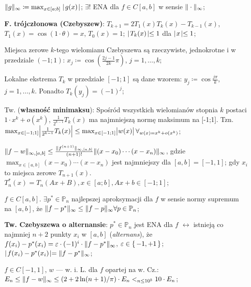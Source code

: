 
\entry
$\|g\|_\infty \coloneqq \max_{x \in [a;b]} \mid\! g(x)\! \mid$;
\entry
$\exists !$
ENA dla
$f\in C[a,b]$
w sensie
$\|\cdot\|_\infty$;


\entry
\textbf{F. trójczłonowa (Czebyszew)}:
$T_{k + 1} = 2T_1(x)T_k(x) - T_{k-1}(x)$,
$T_1(x) = \cos(1 \cdot \theta)=x$,
$T_0(x) = 1$;
\entry
$\mid\! T_k(x)\! \mid \leq 1$
dla
$\mid\! x\! \mid \leq 1$;

\entry
Miejsca zerowe $k$-tego wielomianu Czebyszewa są rzeczywiste, jednokrotne i w przedziale $(-1;1)$:
$x_j \coloneqq \cos(\frac{2j-1}{2k}\pi)$,
$j=1,\ldots,k$;

\entry
Lokalne ekstrema $T_k$ w przedziale $[-1;1]$ są dane wzorem:
$y_j \coloneqq \cos \frac{j\pi}{k}$,
$j=1,\ldots,k$.
Ponadto
$T_k(y_j) = (-1)^j$;

\entry
Tw. (\textbf{własność minimaksu}):
Spośród wszystkich wielomianów stopnia $k$ postaci
$1 \cdot x^k + o(x^k)$,
$\frac{1}{2^{k-1}} T_k(x)$
ma najmniejszą normę maksimum na [-1;1].
Tzn.
$\max_{x \in [-1;1]} \abs{\frac{1}{2^{k-1}} T_k(x)} \leq
\max_{x \in [-1;1]} \abs{w(x)}
\forall_{w(x) = x^k + o(x^k)}$;

\entry
$\|f-w\|_{\infty, [a,b]} \leq
\frac{\|f^{(n+1)}\|_{\infty, [a,b]}}{(n+1)!}
\|(x-x_0) \cdots (x - x_n)\|_\infty$,
gdzie
$\max_{x\in[a,b]} (x-x_0)\cdots(x-x_n)$
jest najmniejszy dla
$[a,b] = [-1,1]$;
gdy $x_i$ to miejsca zerowe $T_{n + 1}(x)$.
\entry
$T^{*}_n(x) = T_n(Ax+B), x \in [a;b], Ax+b \in [-1;1]$;

\entry
$f \in C[a,b]$.
$\exists p^{*} \in \mathbb{P}_n$
najlepszej aproksymacji dla $f$ w sensie normy supremum na $[a,b]$, że
$\|f - p^{*}\|_\infty \leq \|f - p\|_\infty \forall p\in \mathbb{P}_n$;

\entry
\textbf{Tw. Czebyszewa o alternansie}:
$p^{*} \in \mathbb{P}_n$
jest ENA dla $f$
$\leftrightarrow$
istnieją co najmniej $n+2$ punkty $x_i$ w $[a,b]$ (\textit{alternans}), że
$f(x_i) - p^{*}(x_i) = \varepsilon \cdot (-1)^i \cdot \|f - p^{*}\|_\infty$,
$\varepsilon \in \set{-1,+1}$;
$\mid\! f(x_i) - p^{*}(x_i)\! \mid = \|f - p^{*}\|_\infty$;


\entry
$f \in C[-1,1]$,
$w$ --- w. i. L. dla $f$ opartej na w. Cz.:
$E_n \leq
\|f - w\|_\infty \leq
(2 + 2 \ln(n + 1) / \pi)\cdot E_n <_{n \leq 10^5}
10\cdot E_n$;
